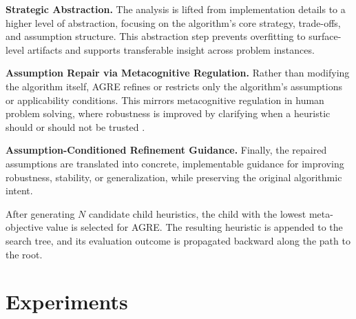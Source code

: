 \documentclass[sigconf,anonymous]{aamas}
\begin{document}
\textbf{Strategic Abstraction.}
The analysis is lifted from implementation details to a higher level of
abstraction, focusing on the algorithm's core strategy, trade-offs, and
assumption structure. This abstraction step prevents overfitting to surface-level artifacts and supports transferable insight across problem instances.

\textbf{Assumption Repair via Metacognitive Regulation.}
Rather than modifying the algorithm itself, AGRE refines or restricts only the
algorithm's assumptions or applicability conditions. This mirrors metacognitive regulation in human problem solving, where robustness
is improved by clarifying when a heuristic should or should not be trusted
\cite{flavell1979}. 

 \textbf{Assumption-Conditioned Refinement Guidance.}
Finally, the repaired assumptions are translated into concrete, implementable
guidance for improving robustness, stability, or generalization, while
preserving the original algorithmic intent.

After generating $N$ candidate child heuristics, the child with the lowest meta-objective value is selected for AGRE. The resulting heuristic is appended to the search tree, and its evaluation outcome is propagated backward along the path to the root.


\section{Experiments}
\end{document}

